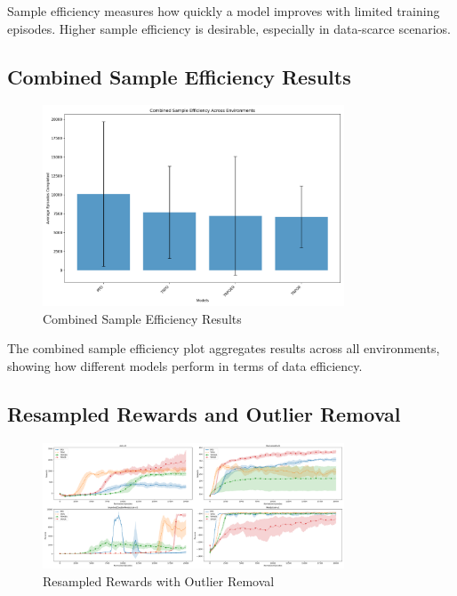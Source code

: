 \documentclass{article}
\begin{document}
Sample efficiency measures how quickly a model improves with limited training episodes. Higher sample efficiency is desirable, especially in data-scarce scenarios.

\subsection*{Combined Sample Efficiency Results}

\begin{figure}[H]
    \centering
    \includegraphics[width=0.8\textwidth]{.assets/sample_efficiency_combined.png}
    \caption{Combined Sample Efficiency Results}
\end{figure}

The combined sample efficiency plot aggregates results across all environments, showing how different models perform in terms of data efficiency.

\subsection*{Resampled Rewards and Outlier Removal}

\begin{figure}[H]
    \centering
    \includegraphics[width=0.8\textwidth]{.assets/resampled_outlier.png}
    \caption{Resampled Rewards with Outlier Removal}
\end{figure}
\end{document}
